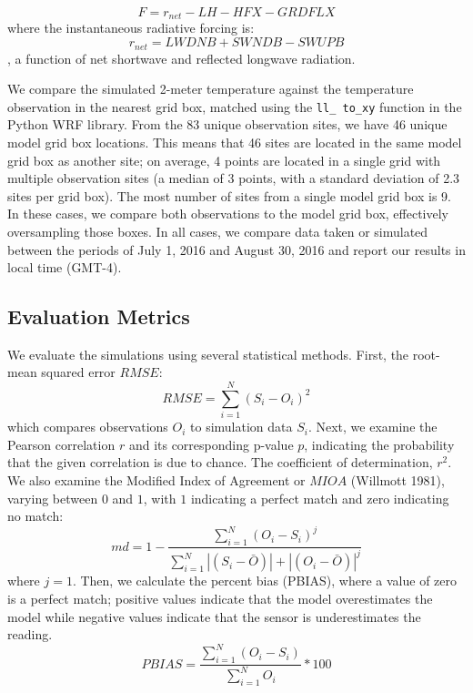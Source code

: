 \begin{equation}
F= r_{net} -LH - HFX - GRDFLX
\end{equation}
where the instantaneous radiative forcing is: $$r_{net}=LWDNB + SWNDB-SWUPB$$, a function of net shortwave and reflected longwave radiation.   

We compare the simulated 2-meter temperature against the temperature observation in the nearest grid box, matched using the \texttt{ll\_ to\_xy} function in the Python WRF library. 
From the 83 unique observation sites, we have 46 unique model grid box locations. This means that 46 sites are located in the same model grid box as another site; on average, 4 points are located in a single grid with multiple observation sites (a median of 3 points, with a standard deviation of 2.3 sites per grid box). The most number of sites from a single model grid box is 9. In these cases, we compare both observations to the model grid box, effectively oversampling those boxes. 
In all cases, we compare data taken or simulated between the periods of July 1, 2016 and August 30, 2016 and report our results in local time (GMT-4). 

\subsection{Evaluation Metrics}
We evaluate the simulations using several statistical methods. 
First, the root-mean squared error $RMSE$:  
\begin{equation}%
RMSE = \sum_{i=1}^{N} \left(S_i - O_i\right)^2
\end{equation}
which compares observations $O_i$ to simulation data $S_i$.
Next, we examine the Pearson correlation $r$ and its corresponding p-value $p$, indicating the probability that the given correlation is due to chance. The coefficient of determination, $r^2$. We also examine the Modified Index of Agreement or $MIOA$ (Willmott 1981), varying between \(0\) and \(1\), with \(1\) indicating a perfect match and zero indicating no match: 
\begin{equation}
md = 1 - \frac{\sum_{i=1}^{N}(O_{i}-S_{i})^{j}}{\sum_{i=1}^{N}|(S_{i}-\bar{O})|+|(O_{i}-\bar{O})|^{j}}
\end{equation}
where $j=1$. 
Then, we calculate the percent bias (PBIAS), where a value of zero is a perfect match; positive values indicate that the model overestimates the model while negative values indicate that the sensor is underestimates the reading.
\begin{equation}
PBIAS = \frac{\sum_{i=1}^{N}(O_{i}-S_{i})}{\sum_{i=1}^{N}O_{i}}*100
\end{equation}

